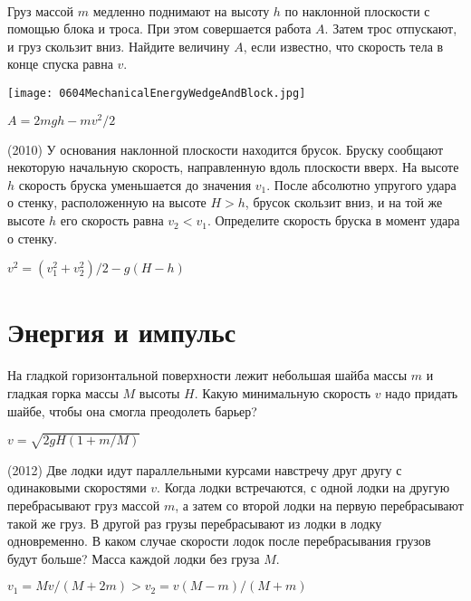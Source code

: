 \begin{ex}
\hspace{0pt} \\
\begin{minipage}{.65\textwidth}
Груз массой $m$ медленно поднимают на высоту $h$ по наклонной плоскости с помощью блока и троса. 
При этом совершается работа $A$. Затем трос отпускают, и груз скользит вниз. Найдите величину $A$, если известно, 
что скорость тела в конце спуска равна $v$.
\end{minipage}
\begin{minipage}{.35\textwidth}
\centering
\texttt{[image: 0604MechanicalEnergyWedgeAndBlock.jpg]}
\end{minipage}
\begin{ans}
$A=2mgh - mv^2/2$
\end{ans}
\end{ex}

\begin{ex}
(2010) У основания наклонной плоскости находится брусок. Бруску сообщают некоторую начальную скорость, 
направленную вдоль плоскости вверх. На высоте $h$ скорость бруска уменьшается до значения $v_1$. 
После абсолютно упругого удара о стенку, расположенную на высоте $H > h$, брусок скользит вниз, 
и на той же высоте $h$ его скорость равна $v_2<v_1$. Определите скорость бруска в момент удара о стенку.
\begin{ans}
$v^2 = (v_1^2 + v_2^2)/2 - g(H-h)$
\end{ans}
\end{ex}

\section{Энергия и импульс}

\begin{ex}
На гладкой горизонтальной поверхности лежит небольшая шайба массы $m$ и гладкая горка массы $M$ высоты $H$. Какую минимальную скорость $v$ надо придать шайбе, чтобы она смогла преодолеть барьер?
\begin{ans}
$v = \sqrt{2gH(1+m/M)}$
\end{ans}
\end{ex}

\begin{ex}
(2012) Две лодки идут параллельными курсами навстречу друг другу с одинаковыми скоростями $v$. Когда лодки встречаются, с одной лодки на другую перебрасывают груз массой $m$, а затем со второй лодки на первую перебрасывают такой же груз. 
В другой раз грузы перебрасывают из лодки в лодку одновременно. В каком случае скорости лодок после перебрасывания грузов будут больше? 
Масса каждой лодки без груза $M$.
\begin{ans}
$v_1 = Mv/(M+2m) > v_2 = v(M-m)/(M+m)$
\end{ans}
\end{ex}

